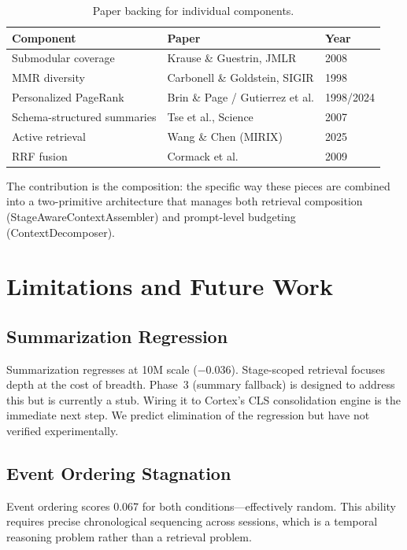 \documentclass[11pt]{article}
\begin{document}
\begin{table}[h]
\centering
\caption{Paper backing for individual components.}
\label{tab:paper-backing}
\begin{tabular}{lll}
\toprule
Component & Paper & Year \\
\midrule
Submodular coverage & Krause \& Guestrin, JMLR & 2008 \\
MMR diversity & Carbonell \& Goldstein, SIGIR & 1998 \\
Personalized PageRank & Brin \& Page / Gutierrez et al. & 1998/2024 \\
Schema-structured summaries & Tse et al., Science & 2007 \\
Active retrieval & Wang \& Chen (MIRIX) & 2025 \\
RRF fusion & Cormack et al. & 2009 \\
\bottomrule
\end{tabular}
\end{table}

The contribution is the composition: the specific way these pieces
are combined into a two-primitive architecture that manages both
retrieval composition (StageAwareContextAssembler) and prompt-level
budgeting (ContextDecomposer).

\section{Limitations and Future Work}
\label{sec:limitations}

\subsection{Summarization Regression}

Summarization regresses at 10M scale ($-0.036$).  Stage-scoped
retrieval focuses depth at the cost of breadth.  Phase~3 (summary
fallback) is designed to address this but is currently a stub.
Wiring it to Cortex's CLS consolidation engine is the immediate next
step.  We predict elimination of the regression but have not verified
experimentally.

\subsection{Event Ordering Stagnation}

Event ordering scores 0.067 for both conditions---effectively random.
This ability requires precise chronological sequencing across
sessions, which is a temporal reasoning problem rather than a
retrieval problem.
\end{document}
